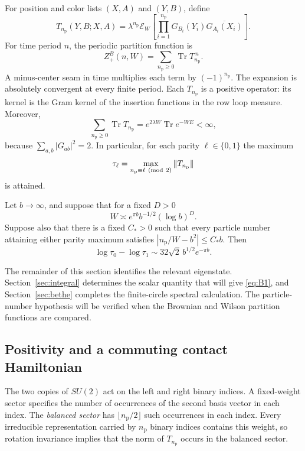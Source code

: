 For position and color lists $(X,A)$ and $(Y,B)$, define
\begin{equation}
 T_{n_{\mathrm p}}(Y,B;X,A)
 =\lambda^{n_{\mathrm p}}\mathcal E_W\left[
       \prod_{i=1}^{n_{\mathrm p}}G_{B_i}(Y_i)
                        \overline{G_{A_i}(X_i)}\right].
 \label{eq:brownian-transfer}
\end{equation}
For time period $n$, the periodic partition function is
\[
 Z^B_+(n,W)=\sum_{n_{\mathrm p}\ge0}
                   \operatorname{Tr}T_{n_{\mathrm p}}^{\,n}.
\]
A minus-center seam in time multiplies each term by $(-1)^{n_{\mathrm p}}$.
The expansion is absolutely convergent at every finite period.  Each
$T_{n_{\mathrm p}}$ is a positive operator: its kernel is the Gram kernel of
the insertion functions in the row loop measure.  Moreover,
\[
 \sum_{n_{\mathrm p}\ge0}\operatorname{Tr}T_{n_{\mathrm p}}
 =e^{2\lambda W}\operatorname{Tr}e^{-WE}<\infty,
\]
because $\sum_{a,b}|G_{ab}|^2=2$.  In particular, for each parity
$\ell\in\{0,1\}$ the maximum
\[
 \tau_\ell=\max_{n_{\mathrm p}\equiv\ell\ ({\rm mod}\ 2)}
                              \|T_{n_{\mathrm p}}\|
\]
is attained.

\begin{proposition}
\label{prop:brownian-parity}
Let $b\to\infty$, and suppose that for a fixed $D>0$
\[
 W\asymp e^{\pi b}b^{-1/2}(\log b)^D.
\]
Suppose also that there is a fixed $C_*>0$ such that every particle number
attaining either parity maximum satisfies
$|n_{\mathrm p}/W-b^2|\le C_*b$.  Then
\begin{equation}
 \log\tau_0-\log\tau_1
       \sim32\sqrt2\,b^{1/2}e^{-\pi b}.
 \label{eq:B1}
\end{equation}
\end{proposition}

The remainder of this section identifies the relevant eigenstate.
Section~\ref{sec:integral} determines the scalar quantity that will give
\eqref{eq:B1}, and Section~\ref{sec:bethe} completes the finite-circle
spectral calculation.  The particle-number hypothesis will be verified
when the Brownian and Wilson partition functions are compared.

\subsection{Positivity and a commuting contact Hamiltonian}

The two copies of $SU(2)$ act on the left and right binary indices.
A fixed-weight sector specifies the number of occurrences of the second
basis vector in each index.  The \emph{balanced sector} has
$\lfloor n_{\mathrm p}/2\rfloor$ such occurrences in each index.  Every
irreducible representation carried by $n_{\mathrm p}$ binary indices
contains this weight, so rotation invariance implies that the norm of
$T_{n_{\mathrm p}}$ occurs in the balanced sector.

